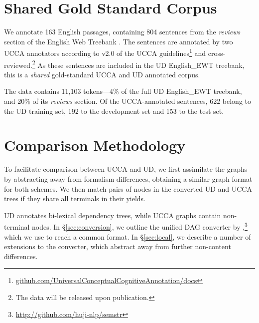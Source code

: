 \documentclass[11pt,a4paper]{article}
\newcommand{\daniel}[1]{\footnote{\color{blue}DH: #1}}
\begin{document}
\section{Shared Gold Standard Corpus}\label{sec:shared}

We annotate 163 English passages, containing 804 sentences
from the \textit{reviews} section of the 
English Web Treebank \cite[EWT; ][]{bies2012english}.
The sentences are annotated by two UCCA annotators
according to v2.0 of the UCCA
guidelines\footnote{\tiny\url{github.com/UniversalConceptualCognitiveAnnotation/docs}}
and cross-reviewed.\footnote{The data will be released upon publication.}
As these sentences are included in the UD
English\_EWT treebank, this is a \textit{shared} gold-standard UCCA and UD
annotated corpus.

The data contains 11,103 tokens---4\% of the full UD English\_EWT treebank,
and 20\% of its \textit{reviews} section.
Of the UCCA-annotated sentences, 622 belong to the UD training set,
192 to the development set and 153 to the test set.


\section{Comparison Methodology}\label{sec:methodology}

To facilitate comparison between UCCA and UD,
we first assimilate the graphs by abstracting away from formalism differences,
obtaining a similar graph format for both schemes.
We then match pairs of nodes in the converted UD and UCCA trees
if they share all terminals in their yields.

UD annotates bi-lexical dependency trees,
while UCCA graphs contain non-terminal nodes.
In \S\ref{sec:conversion}, we outline the unified DAG converter by
\citet{hershcovich2018multitask,hershcovich2018universal},\footnote{\url{http://github.com/huji-nlp/semstr}}
which we use to reach a common format.
In \S\ref{sec:local}, we describe a number of extensions
to the converter, which abstract away from further non-content differences.
\end{document}
